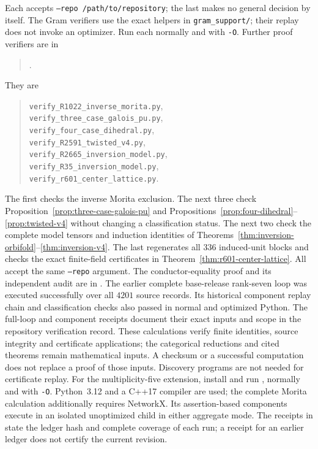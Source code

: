 \documentclass[11pt]{article}
\begin{document}
Each accepts
\texttt{--repo /path/to/repository}; the last makes no general decision
by itself. The Gram verifiers use the exact helpers in
\texttt{gram\_support/}; their replay does not invoke an optimizer.
Run each normally and with \texttt{-O}.
Further proof verifiers are in
\begin{quote}\small
{}.
\end{quote}
They are
\begin{quote}\small
\texttt{verify\_R1022\_inverse\_morita.py},\\
\texttt{verify\_three\_case\_galois\_pu.py},\\
\texttt{verify\_four\_case\_dihedral.py},\\
\texttt{verify\_R2591\_twisted\_v4.py},\\
\texttt{verify\_R2665\_inversion\_model.py},\\
\texttt{verify\_R35\_inversion\_model.py},\\
\texttt{verify\_r601\_center\_lattice.py}.
\end{quote}
The first checks the inverse Morita exclusion. The next three check
Proposition~\ref{prop:three-case-galois-pu} and
Propositions~\ref{prop:four-dihedral}--\ref{prop:twisted-v4} without
changing a classification status. The next two check the complete model
tensors and induction identities of
Theorems~\ref{thm:inversion-orbifold}--\ref{thm:inversion-v4}.
The last regenerates all $336$ induced-unit blocks and checks the exact
finite-field certificates in Theorem~\ref{thm:r601-center-lattice}.
All accept the same \texttt{--repo}
argument. The conductor-equality proof and its independent audit are in
.
The earlier complete base-release rank-seven loop was executed successfully over
all $4201$ source records. Its historical component replay chain and
classification checks also passed in normal and optimized Python.
The full-loop and component receipts document their exact inputs and
scope in the repository verification record. These calculations verify
finite identities, source integrity and certificate applications; the
categorical reductions and cited theorems remain mathematical inputs.
A checksum or a successful computation does not replace a proof of those
inputs. Discovery programs are not needed for certificate replay.
For the multiplicity-five extension, install
 and run
, normally and with
\texttt{-O}.  Python~3.12 and a C++17 compiler are used; the complete
Morita calculation additionally requires NetworkX.  Its assertion-based
components execute in an isolated unoptimized child in either aggregate
mode.  The receipts in  state the
ledger hash and complete coverage of each run; a receipt for an earlier
ledger does not certify the current revision.
\end{document}
